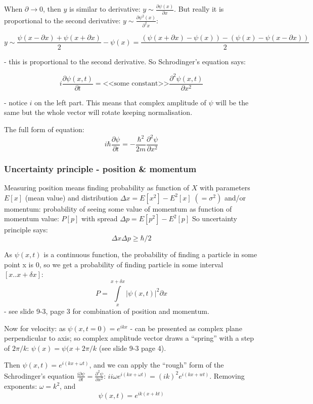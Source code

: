 \documentclass{scrartcl}
\begin{document}
 When $\partial \to 0$, then $y$ is similar to derivative: $y \sim
 \frac{\partial \psi(x)}{\partial x}$. But really it is proportional to the
 second derivative: $y \sim \frac{\partial \psi^2(x)}{\partial^2x}$:

$$ y \sim \frac{\psi(x-\partial x) + \psi(x+\partial x) }2 -
\psi(x) = \frac{ (\psi(x+\partial x)-\psi(x)) - (\psi(x)-\psi(x-\partial x))}2$$

- this is proportional to the second derivative. So Schrodinger's equation says:

$$i \frac{\partial \psi(x,t)}{\partial t} = \text{<<some constant>>}\frac{\partial^2 \psi(x, t)}{\partial x^2}$$

- notice $i$ on the left part. This means that complex amplitude of $\psi$ will
be the same but the whole vector will rotate keeping normalisation.

The full form of equation:
$$ i\hbar\frac{\partial \psi}{\partial t} = - \frac{\hbar ^2}{2m}
\frac{\partial^2 \psi}{\partial x^2}$$

\subsubsection*{Uncertainty principle - position \& momentum}

Measuring position means finding probability as function of $X$ with parameters
$E[x]$ (mean value) and distribution $\Delta x = E[x^2] - E^2[x]\; (=\sigma^2)$
and/or momentum: probability of seeing some value of momentum as function of
momentum value: $P[p]$ with spread $\Delta p = E[p^2] - E^2[p]$ So uncertainty
principle says:
$$ \Delta x \Delta p \geq \hbar / 2$$

As $\psi(x, t)$ is a continuous function, the probability of finding a particle
in some point x is 0, so we get a probability of finding particle in some
interval $[x .. x + \delta x]$:
$$P = \int \limits_x^{x+\delta x} |\psi(x, t)|^2 \partial x $$
- see slide 9-3, page 3 for combination of position and momentum.

Now for velocity: as $\psi(x, t = 0) = e^{ikx}$ - can be presented as complex
plane perpendicular to axis; so complex amplitude vector draws a ``spring'' with
a step of $2 \pi/k$: $\psi(x) = \psi(x + 2\pi/k$ (see slide 9-3 page 4).

Then $\psi(x, t) = e^{i(kx + \omega t)}$, and we can apply the ``rough'' form of
the Schrodinger's equation $\frac{i\partial\psi}{\partial t} = \frac{\partial^2
  \psi}{\partial x^2}$: $ii \omega e^{i(kx + \omega t)} = (ik)^2 e^{i(kx +
  wt)}$. Removing exponents: $\omega = k^2$, and
$$\psi(x, t) = e^{ik(x + kt)}$$
\end{document}
